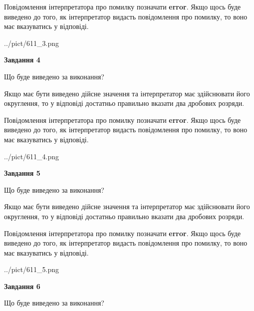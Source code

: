 \documentclass[12pt, ukrainian]{article}
\begin{document}
{\begin {Large}
Повідомлення інтерпретатора про помилку позначати \textbf{error}.
Якщо щось буде виведено до того, як інтерпретатор видасть повідомлення про помилку, 
то воно має вказуватись у відповіді. \par

\begin{center}
	{../pict/611_3.png}
\end{center}
\newpage

{\begin {center}\textbf{Завдання 4}\end {center}}\par
Що буде виведено за виконання? \par

Якщо має бути виведено дійсне значення та інтерпретатор має здійснювати його округлення, 
то у відповіді достатньо правильно вказати два дробових розряди.

Повідомлення інтерпретатора про помилку позначати \textbf{error}.
Якщо щось буде виведено до того, як інтерпретатор видасть повідомлення про помилку, 
то воно має вказуватись у відповіді. \par

\begin{center}
	{../pict/611_4.png}
\end{center}
\newpage

{\begin {center}\textbf{Завдання 5}\end {center}}\par
Що буде виведено за виконання? \par

Якщо має бути виведено дійсне значення та інтерпретатор має здійснювати його округлення, 
то у відповіді достатньо правильно вказати два дробових розряди.

Повідомлення інтерпретатора про помилку позначати \textbf{error}.
Якщо щось буде виведено до того, як інтерпретатор видасть повідомлення про помилку, 
то воно має вказуватись у відповіді. \par

\begin{center}
	{../pict/611_5.png}
\end{center}
\newpage

{\begin {center}\textbf{Завдання 6}\end {center}}\par
Що буде виведено за виконання? \par


\end{Large}}
\end{document}
